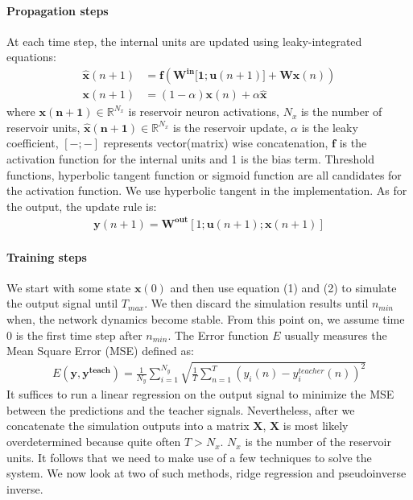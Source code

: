 \documentclass[a4paper,11pt,oneside]{article}
\begin{document}
\paragraph{Propagation steps} At each time step, the internal units are updated using leaky-integrated equations:
\begin{align}
\mathbf{\hat{x}} (n + 1) &= \mathbf{f}(\mathbf{W^{in}[1; u}(n+1)] + \mathbf{Wx}(n)) \\
\mathbf{x}(n + 1) &= (1 - \alpha)\mathbf{x}(n) + \alpha \mathbf{\hat{x}}
\end{align}
where $\mathbf{x(n + 1)} \in \mathbb{R}^{N_x}$ is reservoir neuron activations, $N_x$ is the number of reservoir units, $\mathbf{\hat{x}(n + 1)} \in \mathbb{R}^{N_x}$ is the reservoir update,  $\alpha$ is the leaky coefficient, $[-;-]$ represents vector(matrix) wise concatenation, $\mathbf{f}$ is the activation function for the internal units and 1 is the bias term. Threshold functions, hyperbolic tangent function or sigmoid function are all candidates for the activation function. We use hyperbolic tangent in the implementation.  As for the output, the update rule is:
\begin{align}
\mathbf{y} (n + 1) = \mathbf{W^{out}}[1; \mathbf{u}(n+1);\mathbf{x}(n+1)]
\end{align}


\paragraph{Training steps} We start with some state $\mathbf{x}(0)$ and then use equation (1) and (2) to simulate the output signal until $T_{max}$. We then discard the simulation results until $n_{min}$ when, the network dynamics become stable. From this point on, we assume time 0 is the first time step after $n_{min}$. The Error function $E$ usually measures the Mean Square Error (MSE)  defined as:
\begin{align}
E(\mathbf{y, y^{teach}}) = \frac{1}{N_y} \sum^{N_y}_{i=1} \sqrt{\frac{1}{T} \sum^{T}_{n=1}(y_i(n) - y_i^{teacher}(n) )^2}
\end{align} 
It suffices to run a linear regression on the output signal to minimize the MSE between the predictions and the teacher signals. Nevertheless, after we concatenate the simulation outputs into a matrix $\mathbf{X}$, $\mathbf{X}$ is most likely overdetermined because quite often $ T > N_x $. $N_x$ is the number of the reservoir units. It follows that we need to make use of a few techniques to solve the system. We now look at two of such methods, ridge regression and pseudoinverse inverse.
\end{document}
